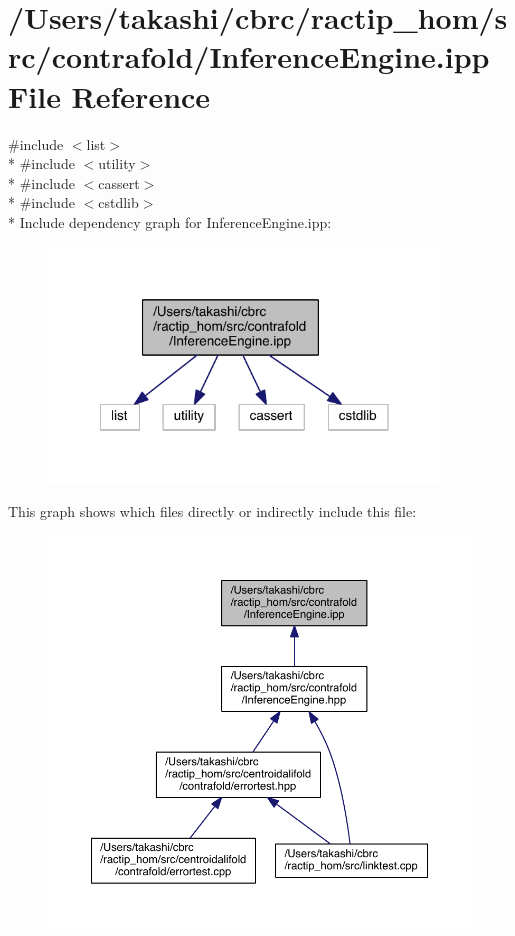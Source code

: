 \hypertarget{contrafold_2_inference_engine_8ipp}{\section{/\+Users/takashi/cbrc/ractip\+\_\+hom/src/contrafold/\+Inference\+Engine.ipp File Reference}
\label{contrafold_2_inference_engine_8ipp}
}
{\ttfamily \#include $<$list$>$}\\*
{\ttfamily \#include $<$utility$>$}\\*
{\ttfamily \#include $<$cassert$>$}\\*
{\ttfamily \#include $<$cstdlib$>$}\\*
Include dependency graph for Inference\+Engine.\+ipp\+:
\nopagebreak
\begin{figure}[H]
\begin{center}
\leavevmode
\includegraphics[width=295pt]{contrafold_2_inference_engine_8ipp__incl}
\end{center}
\end{figure}
This graph shows which files directly or indirectly include this file\+:
\nopagebreak
\begin{figure}[H]
\begin{center}
\leavevmode
\includegraphics[width=350pt]{contrafold_2_inference_engine_8ipp__dep__incl}
\end{center}
\end{figure}
